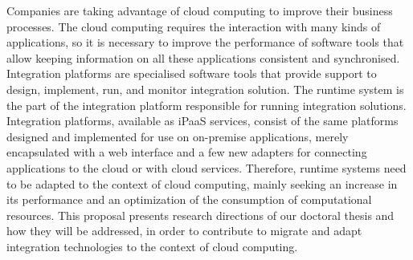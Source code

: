 \label{sec:abstract}

Companies are taking advantage of cloud computing to improve their business processes. The cloud computing requires the interaction with many kinds of applications, so it is necessary to improve the performance of software tools that allow keeping information on all these applications consistent and synchronised. Integration platforms are specialised software tools that provide support to design, implement, run, and monitor integration solution. The runtime system is the part of the integration platform responsible for running integration solutions.
Integration platforms, available as iPaaS services, consist of the same platforms designed and implemented for use on on-premise applications, merely encapsulated with a web interface and a few new adapters for connecting applications to the cloud or with cloud services. Therefore, runtime systems need to be adapted to the context of cloud computing, mainly seeking an increase in its performance and an optimization of the consumption of computational resources. 
This proposal presents research directions of our doctoral thesis and how they will be addressed, in order to contribute to migrate and adapt integration technologies to the context of cloud computing.